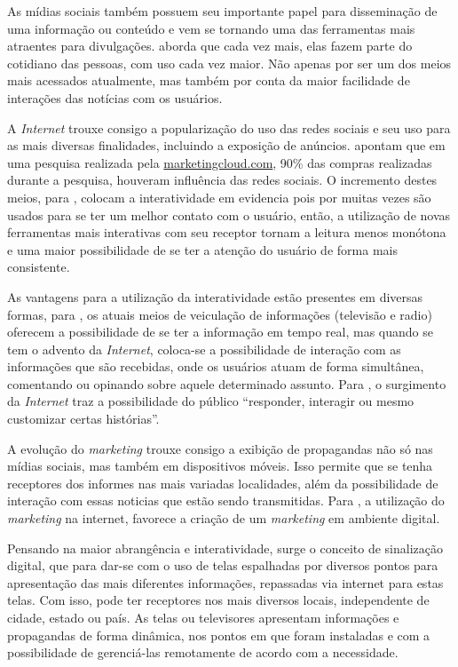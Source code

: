 As mídias sociais também possuem seu importante papel para disseminação de uma informação ou conteúdo e vem se tornando uma das ferramentas mais atraentes para divulgações. \citet{rosa2010} aborda que cada vez mais, elas fazem parte do cotidiano das pessoas, com uso cada vez maior. Não apenas por ser um dos meios mais acessados atualmente, mas também por conta da maior facilidade de interações das notícias com os usuários.

A \textit{Internet} trouxe consigo a popularização do uso das redes sociais e seu uso para as mais diversas finalidades, incluindo a exposição de anúncios. \cite{seo2017} apontam que em uma pesquisa realizada pela \url{marketingcloud.com}, 90\% das compras realizadas durante a pesquisa, houveram influência das redes sociais. O incremento destes meios, para \citet[p.2]{escobar2007}, colocam a interatividade em evidencia pois por muitas vezes são usados para se ter um melhor contato com o usuário, então, a utilização de novas ferramentas mais interativas com seu receptor tornam a leitura menos monótona e uma maior possibilidade de se ter a atenção do usuário de forma mais consistente.

As vantagens para a utilização da interatividade estão presentes em diversas formas, para \citet[p.4]{escobar2007}, os atuais meios de veiculação de informações (televisão e radio) oferecem a possibilidade de se ter a informação em tempo real, mas quando se tem o advento da \textit{Internet}, coloca-se a possibilidade de interação com as informações que são recebidas, onde os usuários atuam de forma simultânea, comentando ou opinando sobre aquele determinado assunto. Para \citet{deuze2002}, o surgimento da \textit{Internet} traz a possibilidade do público ``responder, interagir ou mesmo customizar certas histórias''. 

A evolução do \textit{marketing} trouxe consigo a exibição de propagandas não só nas mídias sociais, mas também em dispositivos móveis. Isso permite que se tenha receptores dos informes nas mais variadas localidades, além da possibilidade de interação com essas noticias que estão sendo transmitidas. Para \citet{santos2014}, a utilização do \textit{marketing} na internet, favorece a criação de um \textit{marketing} em ambiente digital.

Pensando na maior abrangência e interatividade, surge o conceito de sinalização digital, que para \citet[p.37]{machado2010} dar-se com o uso de telas espalhadas por diversos pontos para apresentação das mais diferentes informações, repassadas via internet para estas telas. Com isso, pode ter receptores nos mais diversos locais, independente de cidade, estado ou país. As telas ou televisores apresentam informações e propagandas de forma dinâmica, nos pontos em que foram instaladas e com a possibilidade de gerenciá-las remotamente de acordo com a necessidade. 

